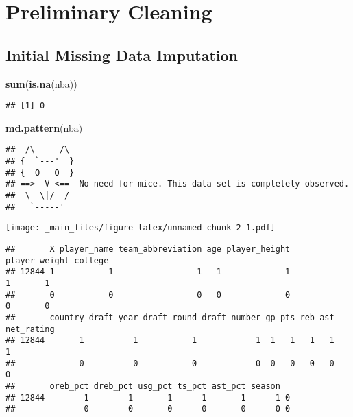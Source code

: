 \documentclass[
]{book}
\newenvironment{Shaded}{\begin{snugshade}}{\end{snugshade}}
\newcommand{\FunctionTok}[1]{\textcolor[rgb]{0.13,0.29,0.53}{\textbf{#1}}}
\newcommand{\NormalTok}[1]{#1}
\theoremstyle{definition}
\theoremstyle{definition}
\theoremstyle{definition}
\theoremstyle{definition}
\theoremstyle{remark}
\begin{document}
\hypertarget{preliminary-cleaning}{%
\section{Preliminary Cleaning}\label{preliminary-cleaning}}

\hypertarget{initial-missing-data-imputation}{%
\subsection{Initial Missing Data Imputation}\label{initial-missing-data-imputation}}

\begin{Shaded}
\begin{Highlighting}[]
\FunctionTok{sum}\NormalTok{(}\FunctionTok{is.na}\NormalTok{(nba))}
\end{Highlighting}
\end{Shaded}

\begin{verbatim}
## [1] 0
\end{verbatim}

\begin{Shaded}
\begin{Highlighting}[]
\FunctionTok{md.pattern}\NormalTok{(nba)}
\end{Highlighting}
\end{Shaded}

\begin{verbatim}
##  /\     /\
## {  `---'  }
## {  O   O  }
## ==>  V <==  No need for mice. This data set is completely observed.
##  \  \|/  /
##   `-----'
\end{verbatim}

\texttt{[image: \_main\_files/figure-latex/unnamed-chunk-2-1.pdf]}

\begin{verbatim}
##       X player_name team_abbreviation age player_height player_weight college
## 12844 1           1                 1   1             1             1       1
##       0           0                 0   0             0             0       0
##       country draft_year draft_round draft_number gp pts reb ast net_rating
## 12844       1          1           1            1  1   1   1   1          1
##             0          0           0            0  0   0   0   0          0
##       oreb_pct dreb_pct usg_pct ts_pct ast_pct season  
## 12844        1        1       1      1       1      1 0
##              0        0       0      0       0      0 0
\end{verbatim}
\end{document}
